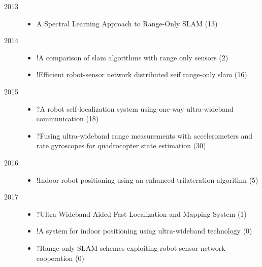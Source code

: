 \begin{description}
\item[2013]
\begin{itemize}
\item A Spectral Learning Approach to Range-Only {SLAM} (13)
\end{itemize}

\item[2014]
\begin{itemize}
\item !A comparison of slam algorithms with range only sensors (2)
\item !Efficient robot-sensor network distributed seif range-only slam (16)
\end{itemize}

\item[2015]
\begin{itemize}
\item ?A robot self-localization system using one-way ultra-wideband communication (18)
\item ?Fusing ultra-wideband range measurements with accelerometers and rate gyroscopes for quadrocopter state estimation (30)
\end{itemize}

\item[2016]
\begin{itemize}
\item !Indoor robot positioning using an enhanced trilateration algorithm (5)
\end{itemize}

\item[2017]
\begin{itemize}
\item ?Ultra-Wideband Aided Fast Localization and Mapping System (1)
\item !A system for indoor positioning using ultra-wideband technology (0)
\item ?Range-only SLAM schemes exploiting robot-sensor network cooperation (0)
\end{itemize}


\end{description}